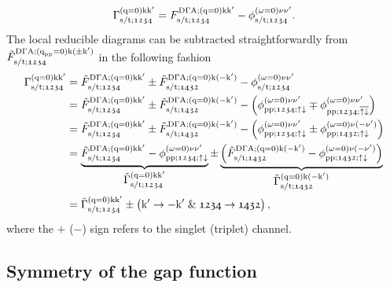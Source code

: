 \documentclass[../../main.tex]{subfiles}
\begin{document}
\begin{align}
	\Gamma_{\text{s}/\text{t};\mathfrak{1234}}^{(\text{q}=0)\text{k}\text{k}'}=F_{\text{s}/\text{t};\mathfrak{1234}}^{\text{D}\Gamma\text{A};(\text{q}=0)\text{k}\text{k}'}-\phi_{\text{s}/\text{t};\mathfrak{1234}}^{(\omega=0)\nu\nu'}.
\end{align}
The local reducible diagrams can be subtracted straightforwardly from $\tilde{F}_{\text{s}/\text{t};\mathfrak{1234}}^{\text{D}\Gamma\text{A};(\text{q}_{\text{pp}}=0)\text{k}(\pm\text{k}')}$ in the following fashion
\begin{align}\label{eq:pairing_vertex_full_formula}
\begin{split}
	\Gamma_{\text{s}/\text{t};\mathfrak{1234}}^{(\text{q}=0)\text{k}\text{k}'}&=\tilde{F}_{\text{s}/\text{t};\mathfrak{1234}}^{\text{D}\Gamma\text{A};(\text{q}=0)\text{k}\text{k}'}\pm \tilde{F}_{\text{s}/\text{t};\mathfrak{1432}}^{\text{D}\Gamma\text{A};(\text{q}=0)\text{k}(-\text{k}')}-\phi_{\text{s}/\text{t};\mathfrak{1234}}^{(\omega=0)\nu\nu'}\\
	&=\tilde{F}_{\text{s}/\text{t};\mathfrak{1234}}^{\text{D}\Gamma\text{A};(\text{q}=0)\text{k}\text{k}'}\pm \tilde{F}_{\text{s}/\text{t};\mathfrak{1432}}^{\text{D}\Gamma\text{A};(\text{q}=0)\text{k}(-\text{k}')}-\left (\phi_{\text{pp};\mathfrak{1234};\uparrow\downarrow}^{(\omega=0)\nu\nu'}\mp \phi_{\text{pp};\mathfrak{1234};\overline{\uparrow\downarrow}}^{(\omega=0)\nu\nu'}\right )\\
	&=\tilde{F}_{\text{s}/\text{t};\mathfrak{1234}}^{\text{D}\Gamma\text{A};(\text{q}=0)\text{k}\text{k}'}\pm \tilde{F}_{\text{s}/\text{t};\mathfrak{1432}}^{\text{D}\Gamma\text{A};(\text{q}=0)\text{k}(-\text{k}')}-\left (\phi_{\text{pp};\mathfrak{1234};\uparrow\downarrow}^{(\omega=0)\nu\nu'}\pm \phi_{\text{pp};\mathfrak{1432};\uparrow\downarrow}^{(\omega=0)\nu(-\nu')}\right )\\
	&=\underbrace{\tilde{F}_{\text{s}/\text{t};\mathfrak{1234}}^{\text{D}\Gamma\text{A};(\text{q}=0)\text{k}\text{k}'}-\phi_{\text{pp};\mathfrak{1234};\uparrow\downarrow}^{(\omega=0)\nu\nu'}}_{\textstyle\tilde{\Gamma}_{\text{s}/\text{t};\mathfrak{1234}}^{(\text{q}=0)\text{k}\text{k}'}}\pm \underbrace{\left (\tilde{F}_{\text{s}/\text{t};\mathfrak{1432}}^{\text{D}\Gamma\text{A};(\text{q}=0)\text{k}(-\text{k}')}- \phi_{\text{pp};\mathfrak{1432};\uparrow\downarrow}^{(\omega=0)\nu(-\nu')}\right )}_{\textstyle\tilde{\Gamma}_{\text{s}/\text{t};\mathfrak{1432}}^{(\text{q}=0)\text{k}(-\text{k}')}}\\
	&=\tilde{\Gamma}_{\text{s}/\text{t};\mathfrak{1234}}^{(\text{q}=0)\text{k}\text{k}'}\pm \left (\text{k}'\rightarrow -\text{k}'\;\&\; \mathfrak{1234}\rightarrow\mathfrak{1432}\right ),
\end{split}
\end{align}
where the $+$ ($-$) sign refers to the singlet (triplet) channel.

\subsection{Symmetry of the gap function}
\end{document}
